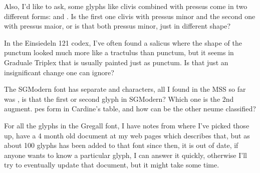 \documentclass[a4paper]{article}
\begin{document}
Also, I'd like to ask, some glyphs like clivis combined with pressus come
in two different forms:
\quad{}\quad and
\quad{}\quad.  Is the first one clivis with
pressus minor and the second one with pressus maior, or is that both pressus
minor, just in different shape?

In the Einsiedeln 121 codex, I've often found a salicus where the shape of
the punctum looked much more like a tractulus than punctum, but it seems
in Graduale Triplex that is usually painted just as punctum.  Is that just
an insignificant change one can ignore?

The SGModern font has separate {\fontsize{16}{16}\color{red}\GreGallModern{}}\quad and \quad
characters, all I found in the MSS so far was \quad, is that
the first or second glyph in SGModern?  Which one is the 2nd augment. pes form in
Cardine's table, and how can be the other neume classified?

For all the glyphs in the Gregall font, I have notes from where I've picked
those up, have a 4 month old document at my web pages which describes that,
but as about 100 glyphs has been added to that font since then, it is out of
date, if anyone wants to know a particular glyph, I can answer it quickly,
otherwise I'll try to eventually update that document, but it might take
some time.

\vfill
\leavevmode{}
\vfill
\leavevmode{}
\vfill
\leavevmode{}
\vfill
\leavevmode{}
\vfill
\leavevmode{}
\vfill
\leavevmode{}
\vfill
\leavevmode{}
\vfill
\end{document}
